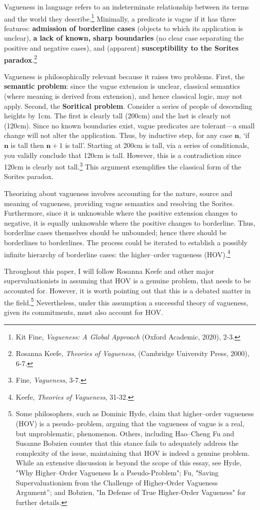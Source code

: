 Vagueness in language refers to an indeterminate relationship between
its terms and the world they describe.\footnote{Kit Fine,
  \emph{Vagueness: A Global Approach} (Oxford Academic, 2020), 2-3.} Minimally,
a predicate is vague if it has three features: \textbf{admission of
borderline cases} (objects to which its application is unclear),
\textbf{a lack of known, sharp boundaries} (no clear case separating the
positive and negative cases), and (apparent) \textbf{susceptibility to
the Sorites paradox}.\footnote{Rosanna Keefe, \emph{Theories of
  Vagueness}, (Cambridge University Press, 2000), 6-7.}

Vagueness is philosophically relevant because it raises two problems.
First, the \textbf{semantic problem}: since the vague extension is
unclear, classical semantics (where meaning is derived from extension),
and hence classical logic, may not apply. Second, the \textbf{Soritical
problem}. Consider a series of people of descending heights by 1cm. The
first is clearly tall (200cm) and the last is clearly not (120cm). Since
no known boundaries exist, vague predicates are tolerant---a small
change will not alter the application. Thus, by inductive step, for any
case $\mathbf{n}$, `if $\mathbf{n}$ is tall then $\mathbf{n}+1$ is tall'.
Starting at 200cm is tall, via a series of conditionals, you validly
conclude that 120cm is tall. However, this is a contradiction since
120cm is clearly not tall.\footnote{Fine, \emph{Vagueness}, 3-7.} This
argument exemplifies the classical form of the Sorites paradox.

Theorizing about vagueness involves accounting for the nature, source
and meaning of vagueness, providing vague semantics and resolving the
Sorites. Furthermore, since it is unknowable where the positive
extension changes to negative, it is equally unknowable where the
positive changes to borderline. Thus, borderline cases themselves should
be unbounded; hence there should be borderlines to borderlines. The
process could be iterated to establish a possibly infinite hierarchy of
borderline cases: the higher--order vagueness (HOV).\footnote{Keefe,
  \emph{Theories of Vagueness}, 31-32.}

Throughout this paper, I will follow Rosanna Keefe and other major
supervaluationists in assuming that HOV is a genuine problem, that needs
to be accounted for. However, it is worth pointing out that this is a
debated matter in the field.\footnote{Some philosophers, such as Dominic
  Hyde, claim that higher--order vagueness (HOV) is a pseudo--problem,
  arguing that the vagueness of vague is a real, but unproblematic,
  phenomenon. Others, including Hao--Cheng Fu and Susanne Bobzien counter
  that this stance fails to adequately address the complexity of the
  issue, maintaining that HOV is indeed a genuine problem. While an
  extensive discussion is beyond the scope of this essay, see Hyde, "Why
  Higher--Order Vagueness Is a Pseudo-Problem"; Fu, "Saving
  Supervaluationism from the Challenge of Higher-Order Vagueness
  Argument''; and Bobzien, "In Defense of True Higher-Order Vagueness"
  for further details.} Nevertheless, under this assumption a successful
theory of vagueness, given its commitments, must also account for HOV.

